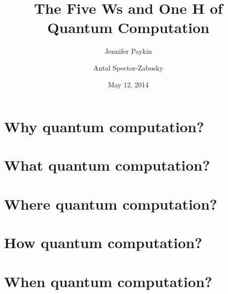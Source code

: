 \documentclass[12pt]{amsart}
\title{The Five Ws and One H of Quantum Computation}
\author{Jennifer Paykin \and Antal Spector-Zabusky}
\date{May 12, 2014}
\begin{document}
\maketitle

\section{Why quantum computation?}\label{sec:why}


\section{What quantum computation?}\label{sec:what}


\section{Where quantum computation?}\label{sec:where}


\section{How quantum computation?}\label{sec:how}


\section{When quantum computation?}\label{sec:when}


\def\refname{Who quantum computation}


\end{document}

